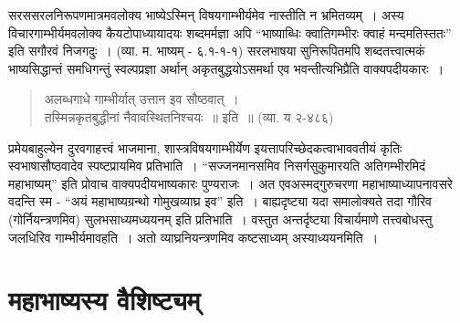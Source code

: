 {सरससरलनिरूपणमात्रमवलोक्य भाष्येऽस्मिन् विषयगाम्भीर्यमेव नास्तीति न भ्रमितव्यम्~। अस्य विचारगाम्भीर्यमवलोक्य कैयटोपाध्यायादयः शब्दमर्मज्ञा अपि “भाष्याब्धिः क्वातिगम्भीरः क्वाहं मन्दमतिस्ततः” इति सगौरवं निजगदुः~। (व्या. म. भाष्यम् - ६.१-१-१) सरलभाषया सुनिरूपितमपि शब्दतत्त्वात्मकं भाष्यसिद्धान्तं समधिगन्तुं स्वल्पप्रज्ञा अर्थान् अकृत\-बुद्धयोऽसमर्था एव भवन्तीत्यभिप्रैति वाक्यपदीयकारः~। 
\begin{verse}
अलब्धगाधे गाम्भीर्यात् उत्तान इव सौष्ठवात्~। \\
तस्मिन्नकृतबुद्धीनां नैवावस्थितनिश्चयः~॥ इति~॥ (व्या. य २-४८६)
\end{verse}
प्रमेयबाहुल्येन दुरवगाहत्त्वं भाजमाना, शास्त्रविषयगाम्भीर्येण इयत्तापरिच्छेदकत्वाभाववतीयं कृतिः स्वभाषासौष्ठवादेव स्पष्टप्रायमिव प्रतिभाति~। “सज्जनमानसमिव निसर्गसुकुमारयति अतिगम्भीरमिदं महाभाष्यम्” इति प्रोवाच वाक्यपदीयभाष्यकारः पुण्यराजः~। अत एव\break अस्मद्गुरुचरणा महाभाष्याध्यापनावसरे वदन्ति स्म - “अयं महाभाष्यग्रन्थो गोमुखव्याघ्र इव” इति~। बाह्यदृष्ट्या यदा समालोक्यते तदा गौरिव (गोर्नियन्त्रणमिव) सुलभसाध्यमध्ययनम् इति प्रतिभाति~। वस्तुत अन्तर्दृष्ट्या विचार्यमाणे तत्त्वबोधस्तु जलधिरिव गाम्भीर्यमावहति~। अतो व्याघ्रनियन्त्रणमिव कष्टसाध्यम् अस्याध्ययनमिति~। 
~\\[-0.75cm]
\section*{महाभाष्यस्य वैशिष्ट्यम्} 

}
